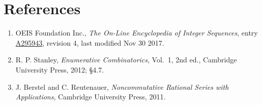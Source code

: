 \documentclass[11pt]{article}
\theoremstyle{definition}
\begin{document}
\section{References}

\begin{enumerate}

\item OEIS Foundation Inc., \emph{The On-Line Encyclopedia of Integer Sequences}, entry \href{https://oeis.org/A295943}{A295943}, revision 4, last modified Nov 30 2017.

\item R. P. Stanley, \emph{Enumerative Combinatorics}, Vol.~1, 2nd ed., Cambridge University Press, 2012; \S4.7.

\item J. Berstel and C. Reutenauer, \emph{Noncommutative Rational Series with Applications}, Cambridge University Press, 2011.

\end{enumerate}
\end{document}
